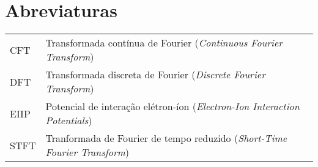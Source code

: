 \chapter{Abreviaturas}

\begin{tabular}{ll}
    CFT         & Transformada contínua de Fourier (\emph{Continuous Fourier Transform})\\
    DFT         & Transformada discreta de Fourier (\emph{Discrete Fourier Transform})\\
    EIIP        & Potencial de interação elétron-íon (\emph{Electron-Ion Interaction Potentials})\\
    STFT        & Tranformada de Fourier de tempo reduzido (\emph{Short-Time Fourier Transform})\\
\end{tabular}